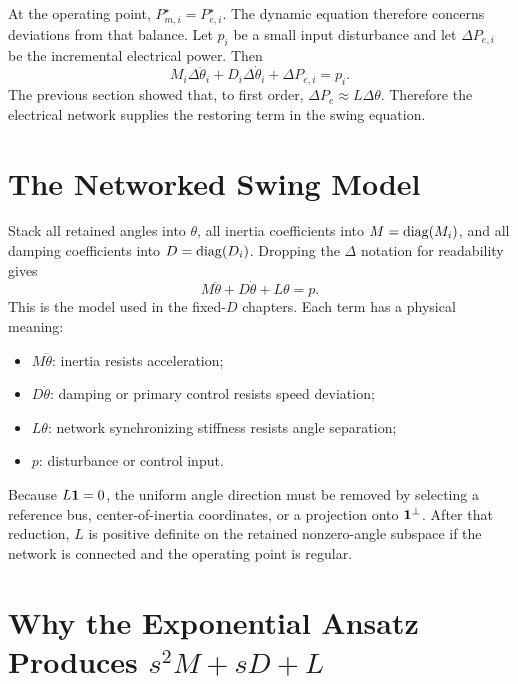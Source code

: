 At the operating point, \(P_{m,i}^\star=P_{e,i}^\star\). The dynamic equation
therefore concerns deviations from that balance. Let \(p_i\) be a small input
disturbance and let \(\Delta P_{e,i}\) be the incremental electrical power.
Then
\begin{equation}
  M_i\Delta\ddot\theta_i+D_i\Delta\dot\theta_i+\Delta P_{e,i}=p_i.
  \label{eq:guide_single_linear_swing}
\end{equation}
The previous section showed that, to first order,
\(\Delta P_e\approx L\Delta\theta\). Therefore the electrical network supplies
the restoring term in the swing equation.

\section{The Networked Swing Model}

Stack all retained angles into \(\theta\), all inertia coefficients into
\(M=\operatorname{diag}(M_i)\), and all damping coefficients into \(D=\operatorname{diag}(D_i)\). Dropping
the \(\Delta\) notation for readability gives
\begin{equation}
  M\ddot\theta+D\dot\theta+L\theta=p.
  \label{eq:guide_network_swing}
\end{equation}
This is the model used in the fixed-\(D\) chapters. Each term has a physical
meaning:
\begin{itemize}
\item \(M\ddot\theta\): inertia resists acceleration;
\item \(D\dot\theta\): damping or primary control resists speed deviation;
\item \(L\theta\): network synchronizing stiffness resists angle separation;
\item \(p\): disturbance or control input.
\end{itemize}

Because \(L\mathbf 1=0\), the uniform angle direction must be removed by selecting
a reference bus, center-of-inertia coordinates, or a projection onto
\(\mathbf 1^\perp\). After that reduction, \(L\) is positive definite on the
retained nonzero-angle subspace if the network is connected and the operating
point is regular.

\section{Why the Exponential Ansatz Produces \texorpdfstring{\(s^2M+sD+L\)}{s2M+sD+L}}

